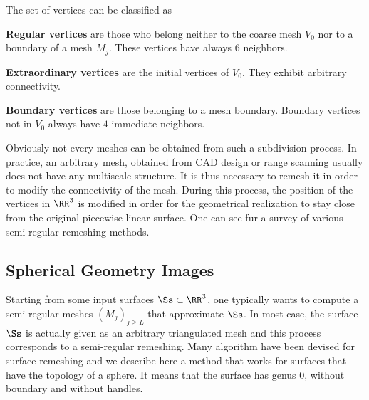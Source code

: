 The set of vertices can be classified as
\begin{rs}
	\item \textbf{Regular vertices} are those who belong	
	 neither to the coarse mesh $V_0$ nor to a boundary of a mesh $M_j$. These vertices have always 6 neighbors.
	\item \textbf{Extraordinary vertices} are the initial vertices of $V_0$. They exhibit arbitrary connectivity.
	\item \textbf{Boundary vertices} are those belonging to a mesh boundary. Boundary vertices not in $V_0$ always have $4$ immediate neighbors.
\end{rs}
Obviously not every meshes can be obtained from such a subdivision process. In practice, an arbitrary mesh, obtained from CAD design or range scanning usually does not have any multiscale structure. It is thus necessary to remesh it in order to modify the connectivity of the mesh. During this process, the position of the vertices in $\RR^3$ is modified in order for the geometrical realization to stay close from the original piecewise linear surface. One can see \cite{alliez-remeshing-survey} fur a survey of various semi-regular remeshing methods. 


\subsection{Spherical Geometry Images}

Starting from some input surfaces $\Ss \subset \RR^3$, one typically wants to compute a semi-regular meshes $(M_j)_{j \geq L}$ that approximate $\Ss$. In most case, the surface $\Ss$ is actually given as an arbitrary triangulated mesh and this process corresponds to a semi-regular remeshing. Many algorithm have been devised for surface remeshing and we describe here a method \cite{praun-spherical} that works for surfaces that have the topology of a sphere. It means that the surface has genus 0, without boundary and without handles.

